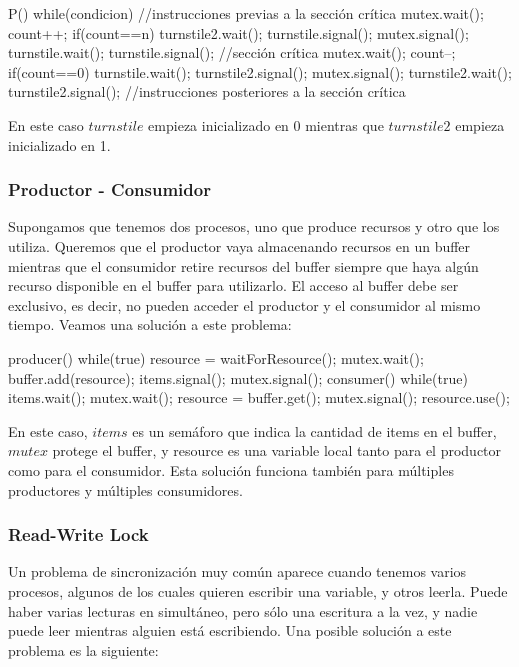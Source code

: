 \documentclass{article}
\begin{document}
\begin{code}
P()
{
    while(condicion)
		{
		    //instrucciones previas a la sección crítica
		    mutex.wait();
				    count++;
						if(count==n)
						{
						    turnstile2.wait();
								turnstile.signal();
						}
				mutex.signal();
				turnstile.wait();
				turnstile.signal();
				//sección crítica
				mutex.wait();
				    count--;
						if(count==0)
						{
						    turnstile.wait();
								turnstile2.signal();
						}
				mutex.signal();
				turnstile2.wait();
				turnstile2.signal();
				//instrucciones posteriores a la sección crítica
		}
}
\end{code}

En este caso $turnstile$ empieza inicializado en 0 mientras que $turnstile2$ empieza inicializado en 1.

\subsubsection{Productor - Consumidor}

Supongamos que tenemos dos procesos, uno que produce recursos y otro que los utiliza. Queremos que el productor vaya almacenando recursos en un buffer mientras que el consumidor retire recursos del buffer siempre que haya alg\'un recurso disponible en el buffer para utilizarlo. El acceso al buffer debe ser exclusivo, es decir, no pueden acceder el productor y el consumidor al mismo tiempo. Veamos una soluci\'on a este problema:

\begin{code}
producer()
{
    while(true)
		{
        resource = waitForResource();
    		mutex.wait();
		        buffer.add(resource);
				    items.signal();
	      mutex.signal();
		}
}
consumer()
{
    while(true)
		{
		    items.wait();
				mutex.wait();
				    resource = buffer.get();
			  mutex.signal();
				resource.use();
		}
}
\end{code}

En este caso, $items$ es un sem\'aforo que indica la cantidad de items en el buffer, $mutex$ protege el buffer, y resource es una variable local tanto para el productor como para el consumidor. Esta soluci\'on funciona tambi\'en para m\'ultiples productores y m\'ultiples consumidores.

\subsubsection{Read-Write Lock}

Un problema de sincronizaci\'on muy com\'un aparece cuando tenemos varios procesos, algunos de los cuales quieren escribir una variable, y otros leerla. Puede haber varias lecturas en simult\'aneo, pero s\'olo una escritura a la vez, y nadie puede leer mientras alguien est\'a escribiendo. Una posible soluci\'on a este problema es la siguiente:
\end{document}
